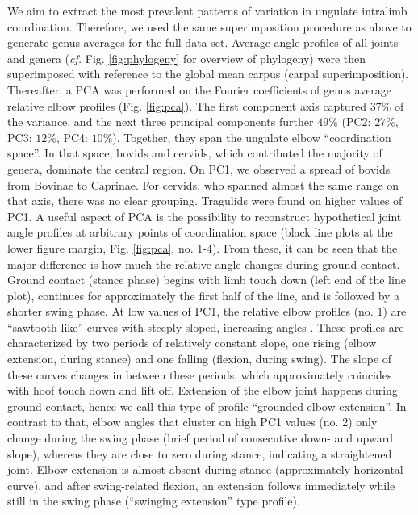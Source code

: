 We aim to extract the most prevalent patterns of variation in ungulate intralimb coordination.
Therefore, we used the same superimposition procedure as above to generate genus averages for the full data set.
Average  angle profiles of all joints and genera (\textit{cf.} Fig. \ref*{fig:phylogeny} for overview of phylogeny) were  then superimposed with reference to the global mean carpus (carpal superimposition).
Thereafter, a PCA was performed on the Fourier coefficients of genus average relative elbow profiles (Fig. \ref{fig:pca}).
The first component axis captured $37\%$ of the variance, and the next three principal components further $49\%$ (PC2: $27\%$, PC3: $12\%$, PC4: $10\%$).
Together, they span the ungulate elbow ``coordination space''.
In that space, bovids and cervids, which contributed the majority of genera, dominate the central region.
On PC1, we observed a spread of bovids from {Bovinae} to {Caprinae}.
For cervids, who spanned almost the same range on that axis, there was no clear grouping.
Tragulids were found on higher values of PC1.
A useful aspect of PCA is the possibility to reconstruct hypothetical joint angle profiles at arbitrary points of coordination space (black line plots at the lower figure margin, Fig. \ref{fig:pca}, no. 1-4).
From these, it can be seen that the major difference is how much the relative  angle changes during ground contact.
Ground contact (stance phase) begins with limb touch down (left end of the line plot), continues for approximately the first half of the line, and is followed by a shorter swing phase.
At low values of PC1, the relative elbow profiles (no. 1) are ``sawtooth-like'' curves with steeply sloped, increasing  angles .
These profiles are characterized by two periods of relatively constant slope, one rising (elbow extension, during stance) and one falling (flexion, during swing).
The slope of these curves changes in between these periods, which approximately coincides with hoof touch down and lift off.
Extension of the elbow joint happens during ground contact, hence we call this type of profile ``grounded elbow extension''.
In contrast to that, elbow  angles that cluster on high PC1 values (no. 2) only change during the swing phase (brief period of consecutive down- and upward slope), whereas they are close to zero during stance, indicating a straightened joint.
Elbow extension is almost absent during stance (approximately horizontal curve), and after swing-related flexion, an extension follows immediately while still in the swing phase (``swinging extension'' type profile).
